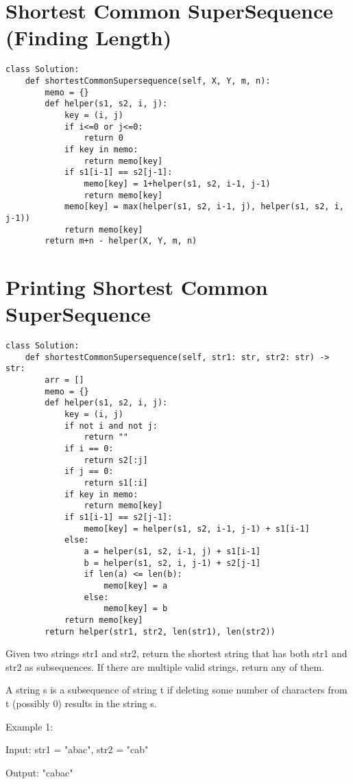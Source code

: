 \documentclass[24pt, a4]{article}
\begin{document}
\newpage
\section{Shortest Common SuperSequence (Finding Length)}
\begin{lstlisting}
class Solution:    
    def shortestCommonSupersequence(self, X, Y, m, n):
        memo = {}
        def helper(s1, s2, i, j):
            key = (i, j)
            if i<=0 or j<=0:
                return 0
            if key in memo:
                return memo[key]
            if s1[i-1] == s2[j-1]:
                memo[key] = 1+helper(s1, s2, i-1, j-1)
                return memo[key]
            memo[key] = max(helper(s1, s2, i-1, j), helper(s1, s2, i, j-1))
            return memo[key]
        return m+n - helper(X, Y, m, n)
\end{lstlisting}
\newpage
\section{Printing Shortest Common SuperSequence}
\begin{lstlisting}
class Solution:
    def shortestCommonSupersequence(self, str1: str, str2: str) -> str:
        arr = []
        memo = {}
        def helper(s1, s2, i, j):
            key = (i, j)
            if not i and not j:
                return ""
            if i == 0:
                return s2[:j]
            if j == 0:
                return s1[:i]
            if key in memo:
                return memo[key]
            if s1[i-1] == s2[j-1]:
                memo[key] = helper(s1, s2, i-1, j-1) + s1[i-1]
            else:
                a = helper(s1, s2, i-1, j) + s1[i-1]
                b = helper(s1, s2, i, j-1) + s2[j-1]  
                if len(a) <= len(b):
                    memo[key] = a
                else:
                    memo[key] = b
            return memo[key]
        return helper(str1, str2, len(str1), len(str2))
\end{lstlisting}
Given two strings str1 and str2, return the shortest string that has both str1 and str2 as subsequences. If there are multiple valid strings, return any of them.

A string s is a subsequence of string t if deleting some number of characters from t (possibly 0) results in the string s.

 

Example 1:

Input: str1 = "abac", str2 = "cab"

Output: "cabac"
\end{document}
